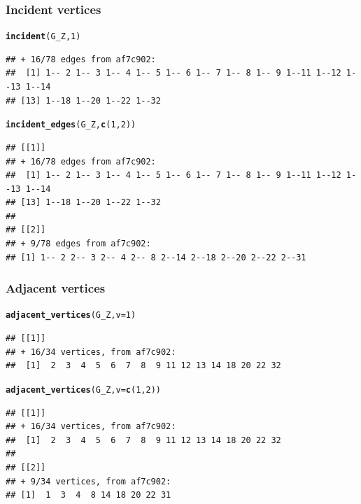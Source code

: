 \documentclass[aspectratio=169]{beamer}\usepackage[]{graphicx}\usepackage[]{xcolor}
\makeatletter
\newcommand{\hlnum}[1]{\textcolor[rgb]{0.686,0.059,0.569}{#1}}%
\newcommand{\hldef}[1]{\textcolor[rgb]{0.345,0.345,0.345}{#1}}%
\newcommand{\hlkwc}[1]{\textcolor[rgb]{0.333,0.667,0.333}{#1}}%
\newcommand{\hlkwd}[1]{\textcolor[rgb]{0.737,0.353,0.396}{\textbf{#1}}}%
\newenvironment{kframe}{%
 \def\at@end@of@kframe{}%
 \ifinner\ifhmode%
  \def\at@end@of@kframe{\end{minipage}}%
  \begin{minipage}{\columnwidth}%
 \fi\fi%
 \def\FrameCommand##1{\hskip\@totalleftmargin \hskip-\fboxsep
 \colorbox{shadecolor}{##1}\hskip-\fboxsep
     \hskip-\linewidth \hskip-\@totalleftmargin \hskip\columnwidth}%
 \MakeFramed {\advance\hsize-\width
   \@totalleftmargin\z@ \linewidth\hsize
   \@setminipage}}%
 {\par\unskip\endMakeFramed%
 \at@end@of@kframe}
\newenvironment{knitrout}{}{} %
\makeatother
\begin{document}
\begin{frame}[fragile]\frametitle{Incident vertices}
\begin{knitrout}
\color{fgcolor}\begin{kframe}
\begin{alltt}
\hlkwd{incident}\hldef{(G_Z,} \hlnum{1}\hldef{)}
\end{alltt}
\begin{verbatim}
## + 16/78 edges from af7c902:
##  [1] 1-- 2 1-- 3 1-- 4 1-- 5 1-- 6 1-- 7 1-- 8 1-- 9 1--11 1--12 1--13 1--14
## [13] 1--18 1--20 1--22 1--32
\end{verbatim}
\begin{alltt}
\hlkwd{incident_edges}\hldef{(G_Z,} \hlkwd{c}\hldef{(}\hlnum{1}\hldef{,} \hlnum{2}\hldef{))}
\end{alltt}
\begin{verbatim}
## [[1]]
## + 16/78 edges from af7c902:
##  [1] 1-- 2 1-- 3 1-- 4 1-- 5 1-- 6 1-- 7 1-- 8 1-- 9 1--11 1--12 1--13 1--14
## [13] 1--18 1--20 1--22 1--32
## 
## [[2]]
## + 9/78 edges from af7c902:
## [1] 1-- 2 2-- 3 2-- 4 2-- 8 2--14 2--18 2--20 2--22 2--31
\end{verbatim}
\end{kframe}
\end{knitrout}
\end{frame}

\begin{frame}[fragile]\frametitle{Adjacent vertices}
\begin{knitrout}
\color{fgcolor}\begin{kframe}
\begin{alltt}
\hlkwd{adjacent_vertices}\hldef{(G_Z,} \hlkwc{v} \hldef{=} \hlnum{1}\hldef{)}
\end{alltt}
\begin{verbatim}
## [[1]]
## + 16/34 vertices, from af7c902:
##  [1]  2  3  4  5  6  7  8  9 11 12 13 14 18 20 22 32
\end{verbatim}
\begin{alltt}
\hlkwd{adjacent_vertices}\hldef{(G_Z,} \hlkwc{v} \hldef{=} \hlkwd{c}\hldef{(}\hlnum{1}\hldef{,} \hlnum{2}\hldef{))}
\end{alltt}
\begin{verbatim}
## [[1]]
## + 16/34 vertices, from af7c902:
##  [1]  2  3  4  5  6  7  8  9 11 12 13 14 18 20 22 32
## 
## [[2]]
## + 9/34 vertices, from af7c902:
## [1]  1  3  4  8 14 18 20 22 31
\end{verbatim}
\end{kframe}
\end{knitrout}
\end{frame}
\end{document}
